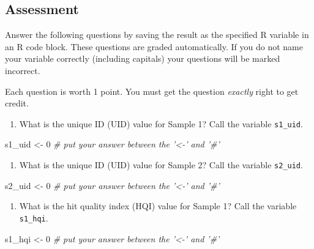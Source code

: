 \documentclass[]{tufte-book}
\newenvironment{Shaded}{}{}
\newcommand{\CommentTok}[1]{\textcolor[rgb]{0.38,0.63,0.69}{\textit{#1}}}
\newcommand{\DecValTok}[1]{\textcolor[rgb]{0.25,0.63,0.44}{#1}}
\newcommand{\NormalTok}[1]{#1}
\newcommand{\StringTok}[1]{\textcolor[rgb]{0.25,0.44,0.63}{#1}}
\providecommand{\tightlist}{%
  \setlength{\itemsep}{0pt}\setlength{\parskip}{0pt}}
\begin{document}
\hypertarget{am-ftir-assessment}{%
\subsection{Assessment}\label{am-ftir-assessment}}

Answer the following questions by saving the result as the specified R variable in an R code block. These questions are graded automatically. If you do not name your variable correctly (including capitals) your questions will be marked incorrect.

Each question is worth 1 point. You must get the question \emph{exactly} right to get credit.

\begin{enumerate}
\def\labelenumi{\arabic{enumi}.}
\tightlist
\item
  What is the unique ID (UID) value for Sample 1? Call the variable \texttt{s1\_uid}.
\end{enumerate}

\begin{Shaded}
\begin{Highlighting}[]
\NormalTok{s1_uid <-}\StringTok{ }\DecValTok{0}     \CommentTok{# put your answer between the '<-' and '#'}
\end{Highlighting}
\end{Shaded}

\begin{enumerate}
\def\labelenumi{\arabic{enumi}.}
\setcounter{enumi}{1}
\tightlist
\item
  What is the unique ID (UID) value for Sample 2? Call the variable \texttt{s2\_uid}.
\end{enumerate}

\begin{Shaded}
\begin{Highlighting}[]
\NormalTok{s2_uid <-}\StringTok{ }\DecValTok{0}     \CommentTok{# put your answer between the '<-' and '#'}
\end{Highlighting}
\end{Shaded}

\begin{enumerate}
\def\labelenumi{\arabic{enumi}.}
\setcounter{enumi}{2}
\tightlist
\item
  What is the hit quality index (HQI) value for Sample 1? Call the variable \texttt{s1\_hqi}.
\end{enumerate}

\begin{Shaded}
\begin{Highlighting}[]
\NormalTok{s1_hqi <-}\StringTok{ }\DecValTok{0}     \CommentTok{# put your answer between the '<-' and '#'}
\end{Highlighting}
\end{Shaded}
\end{document}
